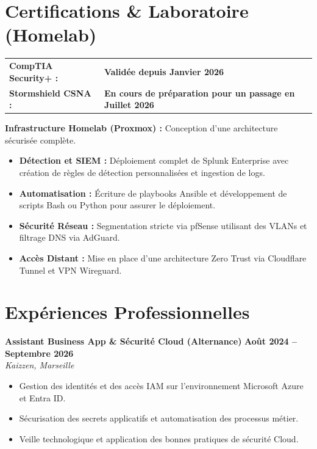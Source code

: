 \documentclass[10pt, a4paper]{article}
\begin{document}
	\section*{Certifications \& Laboratoire (Homelab)}
	
	\noindent
	\begin{tabular}{@{}ll@{}}
		\textbf{CompTIA Security+ :} & \textbf{Validée depuis Janvier 2026} \\
		\textbf{Stormshield CSNA :} & \textbf{En cours de préparation pour un passage en Juillet 2026}
	\end{tabular}
	
	\vspace{6pt}
	\noindent \textbf{Infrastructure Homelab (Proxmox) :} Conception d'une architecture sécurisée complète.
	\vspace{-4pt}
	\begin{itemize}[label={--}, leftmargin=1.0cm, topsep=0pt, partopsep=0pt]
		\item \textbf{Détection et SIEM :} Déploiement complet de Splunk Enterprise avec création de règles de détection personnalisées et ingestion de logs.
		\item \textbf{Automatisation :} Écriture de playbooks Ansible et développement de scripts Bash ou Python pour assurer le déploiement.
		\item \textbf{Sécurité Réseau :} Segmentation stricte via pfSense utilisant des VLANs et filtrage DNS via AdGuard.
		\item \textbf{Accès Distant :} Mise en place d'une architecture Zero Trust via Cloudflare Tunnel et VPN Wireguard.
	\end{itemize}
	
	\section*{Expériences Professionnelles}
	\textbf{Assistant Business App \& Sécurité Cloud (Alternance)} \hfill \textbf{Août 2024 -- Septembre 2026} \\
	\textit{Kaizzen, Marseille}
	\begin{itemize}
		\item Gestion des identités et des accès IAM sur l'environnement Microsoft Azure et Entra ID.
		\item Sécurisation des secrets applicatifs et automatisation des processus métier.
		\item Veille technologique et application des bonnes pratiques de sécurité Cloud.
	\end{itemize}
	
\end{document}
